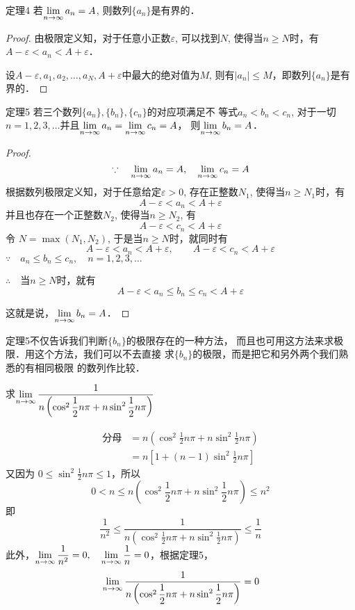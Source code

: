 \begin{blk}{定理4}
    若$\displaystyle\lim_{n\to\infty}a_n=A$, 则数列$\{a_n\}$是有界的．
\end{blk}    

\begin{proof}
由极限定义知，对于任意小正数$\varepsilon$, 可以找到$N$,
使得当$n\ge N$时，有
$A-\varepsilon<a_n<A+\varepsilon$．

设$A-\varepsilon,a_1,a_2,\ldots,a_N,A+\varepsilon$中最大的绝对值为$M$, 
则有$|a_n|\le M$，即数列$\{a_n\}$是有界的．
\end{proof}

\begin{blk}{定理5}
    若三个数列$\{a_n\},\{b_n\},\{c_n\}$的对应项满足不
等式$a_n<b_n<c_n$, 对于一切$n=1,2,3,\ldots$并且$\displaystyle\lim_{n\to\infty}a_n=\displaystyle\lim_{n\to\infty}c_n=A$，
则$\displaystyle\lim_{n\to\infty}b_n=A$．
\end{blk}

\begin{proof}
\[\because\quad \displaystyle\lim_{n\to\infty}a_n=A,\quad \displaystyle\lim_{n\to\infty}c_n=A\]
根据数列极限定义知，对于任意给定$\varepsilon >0$, 存在正整数$N_1$,
使得当$n\ge N_1$时，有
\[A-\varepsilon <a_n<A+\varepsilon\] 
并且也存在一个正整数$N_2$, 使得当$n\ge N_2$, 有
\[A-\varepsilon <c_n<A+\varepsilon\]
令 $N=\max(N_1,N_2)$, 于是当$n\ge N$时，就同时有
\[A-\varepsilon <a_n<A+\varepsilon ,\qquad A-\varepsilon <c_n<A+\varepsilon \]
$\because\quad a_n\le b_n\le c_n,\quad n=1,2,3,\ldots$

$\therefore\quad $当$n\ge N$时，就有
\[A-\varepsilon <a_n\le b_n\le c_n<A+\varepsilon\]

这就是说，$\displaystyle\lim_{n\to\infty}b_n=A$．
\end{proof}

定理5不仅告诉我们判断$\{b_n\}$的极限存在的一种方法，
而且也可用这方法来求极限．用这个方法，我们可以不去直接
求$\{b_n\}$的极限，而是把它和另外两个我们熟悉的有相同极限
的数列作比较．

\begin{example}
    求$\displaystyle\lim_{n\to\infty}\dfrac{1}{n\left(\cos^2\dfrac{1}{2}n\pi+n\sin^2\dfrac{1}{2}n\pi\right)}$
\end{example}

\begin{solution}
\[\begin{split}
    \text{分母}&=n\left(\cos^2\frac{1}{2}n\pi+n\sin^2\frac{1}{2}n\pi\right)\\
    &=n\left[1+(n-1)\sin^2\frac{1}{2}n\pi\right]
\end{split}\]
又因为 $0\le \sin^2\frac{1}{2}n\pi\le 1$，所以
\[0<n\le n\left(\cos^2\frac{1}{2}n\pi+n\sin^2\frac{1}{2}n\pi\right)\le n^2\]
即
\[\frac{1}{n^2}\le \frac{1}{n\left(\cos^2\frac{1}{2}n\pi+n\sin^2\frac{1}{2}n\pi\right)}\le \frac{1}{n}\]
此外，$\displaystyle\lim_{n\to\infty}\dfrac{1}{n^2}=0,\quad \displaystyle\lim_{n\to\infty}\dfrac{1}{n}=0$，根据定理5，
\[\displaystyle\lim_{n\to\infty}\dfrac{1}{n\left(\cos^2\dfrac{1}{2}n\pi+n\sin^2\dfrac{1}{2}n\pi\right)}=0\]
\end{solution}



